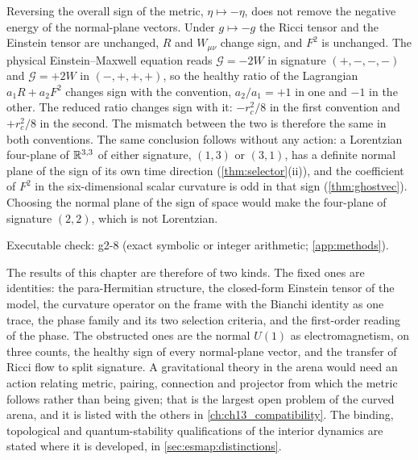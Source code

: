 \begin{remark}
\label{rem:signconv}
Reversing the overall sign of the metric, $\eta\mapsto-\eta$, does not remove the negative energy of the normal-plane vectors. Under
$g\mapsto-g$ the Ricci tensor and the Einstein tensor are unchanged, $R$ and $W_{\mu\nu}$ change sign, and $F^2$ is unchanged. The physical
Einstein--Maxwell equation reads $\mathcal G=-2W$ in signature $(+,-,-,-)$ and $\mathcal G=+2W$ in $(-,+,+,+)$, so the healthy ratio of the
Lagrangian $a_1R+a_2F^2$ changes sign with the convention, $a_2/a_1=+1$ in one and $-1$ in the other. The reduced ratio changes sign with it:
$-r_c^2/8$ in the first convention and $+r_c^2/8$ in the second. The mismatch between the two is therefore the same in both conventions. The
same conclusion follows without any action: a Lorentzian four-plane of $\mathbb{R}^{3,3}$ of either signature, $(1,3)$ or $(3,1)$, has a definite
normal plane of the sign of its own time direction (\cref{thm:selector}(ii)), and the coefficient of $F^2$ in the six-dimensional scalar curvature
is odd in that sign (\cref{thm:ghostvec}). Choosing the normal plane of the sign of space would make the four-plane of signature $(2,2)$, which is
not Lorentzian.
\end{remark}

\noindent Executable check: g2-8 (exact symbolic or integer arithmetic; \cref{app:methods}).

The results of this chapter are therefore of two kinds. The fixed ones are identities: the para-Hermitian structure, the closed-form
Einstein tensor of the model, the curvature operator on the frame with the Bianchi identity as one trace, the phase family and its two
selection criteria, and the first-order reading of the phase. The obstructed ones are the normal $U(1)$ as electromagnetism, on three counts,
the healthy sign of every normal-plane vector, and the transfer of Ricci flow to split signature. A gravitational theory in the arena would
need an action relating metric, pairing, connection and projector from which the metric follows rather than being given; that is the
largest open problem of the curved arena, and it is listed with the others in \cref{ch:ch13_compatibility}. The binding, topological and
quantum-stability qualifications of the interior dynamics are stated where it is developed, in
\cref{sec:esmap:distinctions}.
